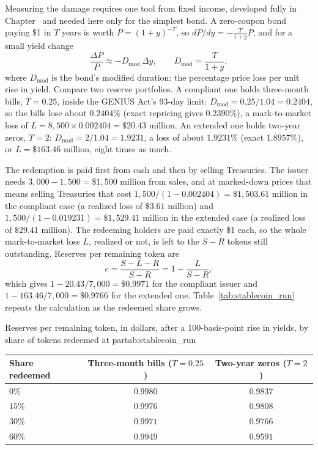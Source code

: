 \documentclass[../ai_in_finance]{subfiles}
\begin{document}
Measuring the damage requires one tool from fixed income, developed fully in Chapter~ and needed here only for the simplest bond. A zero-coupon bond paying \$1 in $T$ years is worth $P = (1+y)^{-T}$, so $dP/dy = -\frac{T}{1+y}P$, and for a small yield change
\begin{equation}
\frac{\Delta P}{P} \approx -D_{\text{mod}}\,\Delta y, \qquad D_{\text{mod}} = \frac{T}{1+y},\label{eq:markets-duration-approx}
\end{equation}
where $D_{\text{mod}}$ is the bond's modified duration: the percentage price loss per unit rise in yield. Compare two reserve portfolios. A compliant one holds three-month bills, $T = 0.25$, inside the GENIUS Act's 93-day limit: $D_{\text{mod}} = 0.25/1.04 = 0.2404$, so the bills lose about $0.2404\%$ (exact repricing gives $0.2390\%$), a mark-to-market loss of $L = 8{,}500 \times 0.002404 = \$20.43$ million. An extended one holds two-year zeros, $T = 2$: $D_{\text{mod}} = 2/1.04 = 1.9231$, a loss of about $1.9231\%$ (exact $1.8957\%$), or $L = \$163.46$ million, eight times as much.

The redemption is paid first from cash and then by selling Treasuries. The issuer needs $3{,}000 - 1{,}500 = \$1{,}500$ million from sales, and at marked-down prices that means selling Treasuries that cost $1{,}500/(1 - 0.002404) = \$1{,}503.61$ million in the compliant case (a realized loss of $\$3.61$ million) and $1{,}500/(1 - 0.019231) = \$1{,}529.41$ million in the extended case (a realized loss of $\$29.41$ million). The redeeming holders are paid exactly \$1 each, so the whole mark-to-market loss $L$, realized or not, is left to the $S - R$ tokens still outstanding. Reserves per remaining token are
\begin{equation}
c = \frac{S - L - R}{S - R} = 1 - \frac{L}{S - R},\label{eq:markets-stablecoin-coverage}
\end{equation}
which gives $1 - 20.43/7{,}000 = \$0.9971$ for the compliant issuer and $1 - 163.46/7{,}000 = \$0.9766$ for the extended one. Table~\ref{tab:stablecoin_run} repeats the calculation as the redeemed share grows.

\begin{booktable}[htbp]{Reserves per remaining token, in dollars, after a 100-basis-point rise in yields, by share of tokens redeemed at par}{tab:stablecoin_run}
\begin{tabular}{lcc}
\toprule
Share redeemed & Three-month bills ($T=0.25$) & Two-year zeros ($T=2$) \\
\midrule
$0\%$ & $0.9980$ & $0.9837$ \\
$15\%$ & $0.9976$ & $0.9808$ \\
$30\%$ & $0.9971$ & $0.9766$ \\
$60\%$ & $0.9949$ & $0.9591$ \\
\bottomrule
\end{tabular}
\end{booktable}
\end{document}

